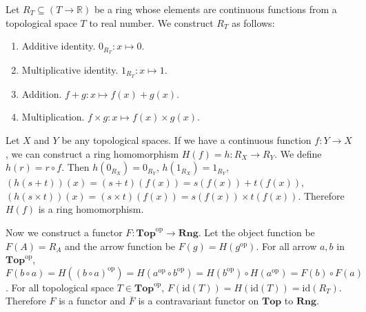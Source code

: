 \documentclass{article}
\begin{document}
\subsubsection{}



\showArt

Let $R_T \subseteq (T \rightarrow \mathbb{R})$ be a ring whose elements are continuous functions from a topological space $T$ to real number. We construct $R_T$ as follows:

\begin{enumerate}
    \item Additive identity. $0_{R_T} : x \mapsto 0$.
    \item Multiplicative identity. $1_{R_T} : x \mapsto 1$.
    \item Addition. $f + g : x \mapsto f(x) + g(x)$.
    \item Multiplication. $f \times g : x \mapsto f(x) \times g(x)$.
\end{enumerate}

Let $X$ and $Y$ be any topological spaces. If we have a continuous function $f : Y \rightarrow X$, we can construct a ring homomorphism $H(f) = h : R_X \rightarrow R_Y$. We define $h(r) = r \circ f$. Then $h(0_{R_X}) = 0_{R_Y}$, $h(1_{R_X}) = 1_{R_Y}$, $(h(s + t))(x) = (s + t)(f(x)) = s(f(x)) + t(f(x))$, $(h(s \times t))(x) = (s \times t)(f(x)) = s(f(x)) \times t(f(x))$. Therefore $H(f)$ is a ring homomorphism.

Now we construct a functor $F : \mathbf{Top}^{\mathrm{op}} \rightarrow \mathbf{Rng}$. Let the object function be $F(A) = R_A$ and the arrow function be $F(g) = H(g^{\mathrm{op}})$. For all arrow $a, b$ in $\mathbf{Top}^{\mathrm{op}}$, $F(b \circ a) = H((b \circ a)^{\mathrm{op}}) = H(a^{\mathrm{op}} \circ b^{\mathrm{op}}) = H(b^{\mathrm{op}}) \circ H(a^{\mathrm{op}}) = F(b) \circ F(a)$. For all topological space $T \in \mathbf{Top}^{\mathrm{op}}$, $F(\mathrm{id}(T)) = H(\mathrm{id}(T)) = \mathrm{id}(R_T)$. Therefore $F$ is a functor and $\overline{F}$ is a contravariant functor on $\mathbf{Top}$ to $\mathbf{Rng}$.

\subsection{}

\subsubsection{}
\end{document}
